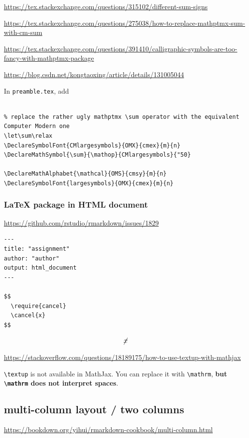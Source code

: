 \documentclass[
]{book}
\theoremstyle{definition}
\theoremstyle{definition}
\theoremstyle{definition}
\theoremstyle{definition}
\theoremstyle{remark}
\begin{document}
\url{https://tex.stackexchange.com/questions/315102/different-sum-signs}

\url{https://tex.stackexchange.com/questions/275038/how-to-replace-mathptmx-sum-with-cm-sum}

\url{https://tex.stackexchange.com/questions/391410/calligraphic-symbols-are-too-fancy-with-mathptmx-package}

\url{https://blog.csdn.net/kongtaoxing/article/details/131005044}

In \texttt{preamble.tex}, add

\begin{verbatim}

% replace the rather ugly mathptmx \sum operator with the equivalent Computer Modern one
\let\sum\relax
\DeclareSymbolFont{CMlargesymbols}{OMX}{cmex}{m}{n}
\DeclareMathSymbol{\sum}{\mathop}{CMlargesymbols}{"50}

\DeclareMathAlphabet{\mathcal}{OMS}{cmsy}{m}{n}
\DeclareSymbolFont{largesymbols}{OMX}{cmex}{m}{n}
\end{verbatim}

\hypertarget{latex-package-in-html-document}{%
\subsubsection{LaTeX package in HTML document}\label{latex-package-in-html-document}}

\url{https://github.com/rstudio/rmarkdown/issues/1829}

\begin{verbatim}
---
title: "assignment"
author: "author"
output: html_document
---

$$
  \require{cancel}
  \cancel{x}
$$
\end{verbatim}

\[
  \cancel{x}
\]

\url{https://stackoverflow.com/questions/18189175/how-to-use-textup-with-mathjax}

\texttt{\textbackslash{}textup} is not available in MathJax. You can replace it with \texttt{\textbackslash{}mathrm}, \textbf{but \texttt{\textbackslash{}mathrm} does not interpret spaces}.

\hypertarget{multi-column}{%
\subsection{multi-column layout / two columns}\label{multi-column}}

\url{https://bookdown.org/yihui/rmarkdown-cookbook/multi-column.html}
\end{document}
